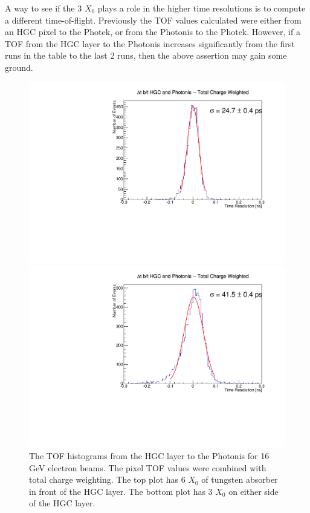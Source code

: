 \documentclass[twocolumn,aps,prd,reprint,superscriptaddress,floatfix]{revtex4-1}
\begin{document}
A way to see if the 3 $X_0$ plays a role in the higher time resolutions is to compute a different time-of-flight.
Previously the TOF values calculated were either from an HGC pixel to the Photek, or from the Photonis to the Photek.
However, if a TOF from the HGC layer to the Photonis increases significantly from the first runs in the table to the last 2 runs, then the above assertion may gain some ground.

\begin{figure}[!htbp]
\centering
	\includegraphics[width=\linewidth]{deltaT_PicoSil_vs_MCP_TotalCharge_16gev.pdf}
    
	\includegraphics[width=\linewidth]{deltaT_PicoSil_vs_MCP_TotalCharge_16gevDelay.pdf}
	\caption{The TOF histograms from the HGC layer to the Photonis for 16 GeV electron beams.
	The pixel TOF values were combined with total charge weighting.
	The top plot has 6 $X_0$ of tungsten absorber in front of the HGC layer.
	The bottom plot has 3 $X_0$ on either side of the HGC layer.}
	\label{fig:HGCvsMCP}
\end{figure}
\end{document}
